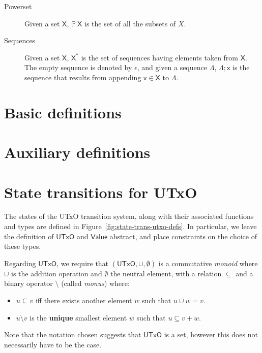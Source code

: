 \documentclass[11pt,a4paper]{article}
\newcommand{\powerset}[1]{\mathbb{P}~#1}
\newcommand{\var}[1]{\mathit{#1}}
\newcommand{\type}[1]{\mathsf{#1}}
\newcommand{\seqof}[1]{#1^{*}}
\newcommand{\UTxO}{\type{UTxO}}
\newcommand{\Value}{\type{Value}}
\begin{document}
\begin{description}
\item[Powerset] Given a set $\type{X}$, $\powerset{\type{X}}$ is the set of all
  the subsets of $X$.
\item[Sequences] Given a set $\type{X}$, $\seqof{\type{X}}$ is the set of
  sequences having elements taken from $\type{X}$. The empty sequence is
  denoted by $\epsilon$, and given a sequence $\Lambda$, $\Lambda; \type{x}$ is
  the sequence that results from appending $\type{x} \in \type{X}$ to
  $\Lambda$.
\end{description}

\section{Basic definitions}
\label{sec:basic-definitions}

\section{Auxiliary definitions}
\label{sec:auxil-defin}

\section{State transitions for UTxO}
\label{sec:state-trans-utxo-1}

The states of the UTxO transition system, along with their associated functions
and types are defined in Figure~\ref{fig:state-trans-utxo-defs}. In particular,
we leave the definition of $\UTxO$ and $\Value$ abstract, and place constraints
on the choice of these types.

Regarding $\UTxO$, we require that $(\UTxO, \cup, \emptyset)$ is a commutative
\textit{monoid} where $\cup$ is the addition operation and $\emptyset$ the
neutral element, with a relation $\subseteq$ and a binary operator $\setminus$
(called \textit{monus}) where:

\begin{itemize}
\item $\var{u} \subseteq \var{v}$ iff there exists another element $\var{w}$
  such that $\var{u} \cup \var{w} = \var{v}$.
\item $\var{u} \setminus \var{v}$ is the \textbf{unique} smallest element
  $\var{w}$ such that $\var{u} \subseteq \var{v} + \var{w}$.
\end{itemize}

Note that the notation chosen suggests that $\UTxO$ is a set, however this does not
necessarily have to be the case.
\end{document}
